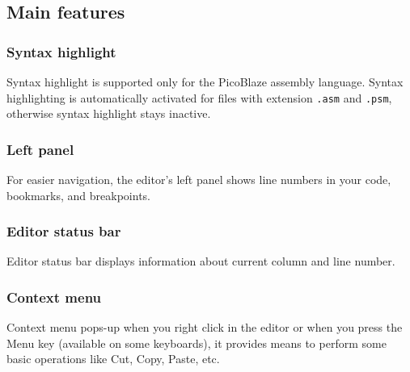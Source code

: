     \subsection{Main features}
        \subsubsection{Syntax highlight}
            Syntax highlight is supported only for the PicoBlaze assembly language. Syntax highlighting is automatically activated for files with extension \texttt{.asm} and \texttt{.psm}, otherwise syntax highlight stays inactive.

        \subsubsection{Left panel}
            For easier navigation, the editor's left panel shows line numbers in your code, bookmarks, and breakpoints.

        \subsubsection{Editor status bar}
            Editor status bar displays information about current column and line number.

        \subsubsection{Context menu}
            Context menu pops-up when you right click in the editor or when you press the Menu key (available on some keyboards), it provides means to perform some basic operations like Cut, Copy, Paste, etc.

    \enlargethispage{6\baselineskip}
